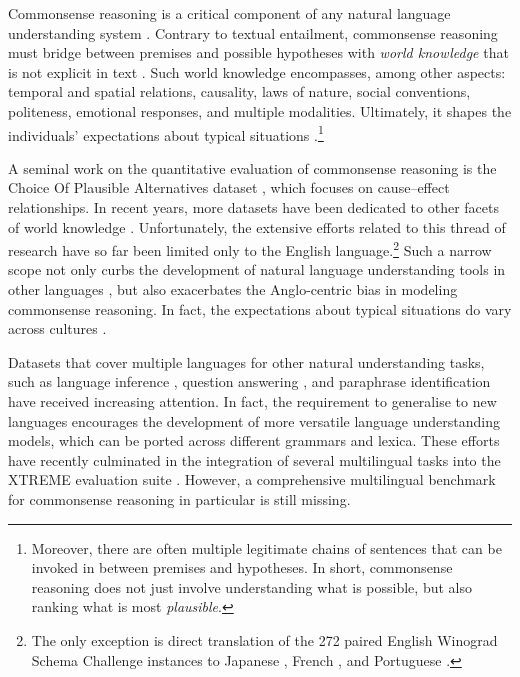 \documentclass[11pt,a4paper]{article}
\begin{document}
Commonsense reasoning is a critical component of any natural language understanding system \cite{Davis:2015cacm}. Contrary to textual entailment, commonsense reasoning must bridge between premises and possible hypotheses with \textit{world knowledge} that is not explicit in text \citep{singer1992validation}. Such world knowledge encompasses, among other aspects: temporal and spatial relations, causality, laws of nature, social conventions, politeness, emotional responses, and multiple modalities. Ultimately, it shapes the individuals' expectations about typical situations \citep{shoham1990nonmonotonic}.\footnote{Moreover, there are often multiple legitimate chains of sentences that can be invoked in between premises and hypotheses. In short, commonsense reasoning does not just involve understanding what is possible, but also ranking what is most \textit{plausible}.}

A seminal work on the quantitative evaluation of commonsense reasoning is the Choice Of Plausible Alternatives dataset \citep[COPA;][]{Roemmele:2011aaai}, which focuses on cause--effect relationships. In recent years, more datasets have been dedicated to other facets of world knowledge \citep[\textit{inter alia}]{Sakaguchi:2020aaai,Bisk:2020aaai,Bhagavatula:2020iclr,Rashkin:2018acl,Sap:2019siqa}. Unfortunately, the extensive efforts related to this thread of research have so far been limited only to the English language.\footnote{The only exception is direct translation of the 272 paired English Winograd Schema Challenge instances to Japanese \cite{WSCja}, French \cite{Amsili:2017french}, and Portuguese \cite{Melo:2020eniac}.} Such a narrow scope not only curbs the development of natural language understanding tools in other languages \cite{Bender:2011lilt,Ponti:2019cl}, but also exacerbates the Anglo-centric bias in modeling commonsense reasoning. In fact, the expectations about typical situations do vary across cultures \citep{thomas1983cross}.

Datasets that cover multiple languages for other natural understanding tasks, such as language inference \citep{Conneau:2018emnlp}, question answering \citep{Lewis:2019arxiv,artetxe2020translation,tydiqa}, and paraphrase identification \citep{Yang:2019emnlp} have received increasing attention. In fact, the requirement to generalise to new languages encourages the development of more versatile language understanding models, which can be ported across different grammars and lexica. These efforts have recently culminated in the integration of several multilingual tasks into the XTREME evaluation suite \cite{Hu:2020arxiv}. However, 
a comprehensive multilingual benchmark for commonsense reasoning in particular is still missing. 
\end{document}
